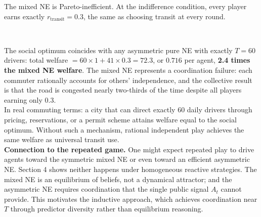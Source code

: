 \documentclass[letterpaper]{article}
\begin{document}
The mixed NE is Pareto-inefficient. At the indifference condition, every player earns exactly $r_{\text{transit}} = 0.3$, the same as choosing transit at every round. \\

\begin{table}[H]
\centering
\small
{} \\
\caption{Welfare Analysis}
\label{tab:welfare}
\end{table}

The social optimum coincides with any asymmetric pure NE with exactly $T=60$ drivers: total welfare $= 60 \times 1 + 41 \times 0.3 = 72.3$, or $0.716$ per agent, \textbf{2.4 times the mixed NE welfare}. The mixed NE represents a coordination failure: each commuter rationally accounts for others' independence, and the collective result is that the road is congested nearly two-thirds of the time despite all players earning only $0.3$. \\

In real commuting terms: a city that can direct exactly 60 daily drivers through pricing, reservations, or a permit scheme attains welfare equal to the social optimum. Without such a mechanism, rational independent play achieves the same welfare as universal transit use. \\

\textbf{Connection to the repeated game.} One might expect repeated play to drive agents toward the symmetric mixed NE or even toward an efficient asymmetric NE. Section 4 shows neither happens under homogeneous reactive strategies. The mixed NE is an equilibrium of beliefs, not a dynamical attractor; and the asymmetric NE requires coordination that the single public signal $A_t$ cannot provide. This motivates the inductive approach, which achieves coordination near $T$ through predictor diversity rather than equilibrium reasoning. \\
\end{document}
